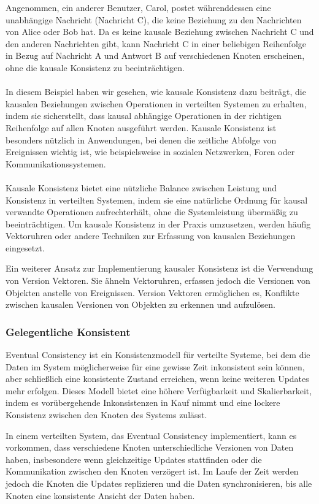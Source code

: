 \documentclass[../vs-script-first-v01.tex]{subfiles}
\begin{document}
Angenommen, ein anderer Benutzer, Carol, postet währenddessen eine unabhängige Nachricht (Nachricht C), die keine Beziehung zu den Nachrichten von Alice oder Bob hat. Da es keine kausale Beziehung zwischen Nachricht C und den anderen Nachrichten gibt, kann Nachricht C in einer beliebigen Reihenfolge in Bezug auf Nachricht A und Antwort B auf verschiedenen Knoten erscheinen, ohne die kausale Konsistenz zu beeinträchtigen.
\\\\
In diesem Beispiel haben wir gesehen, wie kausale Konsistenz dazu beiträgt, die kausalen Beziehungen zwischen Operationen in verteilten Systemen zu erhalten, indem sie sicherstellt, dass kausal abhängige Operationen in der richtigen Reihenfolge auf allen Knoten ausgeführt werden. Kausale Konsistenz ist besonders nützlich in Anwendungen, bei denen die zeitliche Abfolge von Ereignissen wichtig ist, wie beispielsweise in sozialen Netzwerken, Foren oder Kommunikationssystemen.
\\\\
Kausale Konsistenz bietet eine nützliche Balance zwischen Leistung und Konsistenz in verteilten Systemen, indem sie eine natürliche Ordnung für kausal verwandte Operationen aufrechterhält, ohne die Systemleistung übermäßig zu beeinträchtigen. Um kausale Konsistenz in der Praxis umzusetzen, werden häufig Vektoruhren oder andere Techniken zur Erfassung von kausalen Beziehungen eingesetzt.

Ein weiterer Ansatz zur Implementierung kausaler Konsistenz ist die Verwendung von Version Vektoren. Sie ähneln Vektoruhren, erfassen jedoch die Versionen von Objekten anstelle von Ereignissen. Version Vektoren ermöglichen es, Konflikte zwischen kausalen Versionen von Objekten zu erkennen und aufzulösen.

\subsubsection{Gelegentliche Konsistent}
Eventual Consistency ist ein Konsistenzmodell für verteilte Systeme, bei dem die Daten im System möglicherweise für eine gewisse Zeit inkonsistent sein können, aber schließlich eine konsistente Zustand erreichen, wenn keine weiteren Updates mehr erfolgen. Dieses Modell bietet eine höhere Verfügbarkeit und Skalierbarkeit, indem es vorübergehende Inkonsistenzen in Kauf nimmt und eine lockere Konsistenz zwischen den Knoten des Systems zulässt.

In einem verteilten System, das Eventual Consistency implementiert, kann es vorkommen, dass verschiedene Knoten unterschiedliche Versionen von Daten haben, insbesondere wenn gleichzeitige Updates stattfinden oder die Kommunikation zwischen den Knoten verzögert ist. Im Laufe der Zeit werden jedoch die Knoten die Updates replizieren und die Daten synchronisieren, bis alle Knoten eine konsistente Ansicht der Daten haben.
\end{document}
